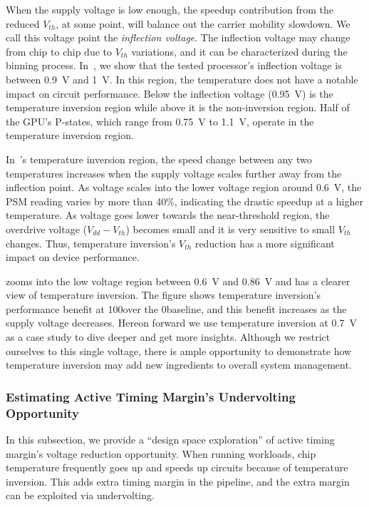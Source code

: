 When the supply voltage is low enough, the speedup contribution from the reduced $V_{th}$, at some point, will balance out the carrier mobility slowdown. We call this voltage point the {\it inflection voltage}. The inflection voltage may change from chip to chip due to $V_{th}$ variations, and it can be characterized during the binning process. In~, we show that the tested processor's inflection voltage is between 0.9~V and 1~V. In this region, the temperature does not have a notable impact on circuit performance. Below the inflection voltage (0.95~V) is the temperature inversion region while above it is the non-inversion region. Half of the GPU's P-states, which range from 0.75~V to 1.1~V, operate in the temperature inversion region.

In~'s temperature inversion region, the speed change between any two temperatures increases when the supply voltage scales further away from the inflection point. As voltage scales into the lower voltage region around 0.6~V, the PSM reading varies by more than 40\%, indicating the drastic speedup at a higher temperature. As voltage goes lower towards the near-threshold region, the overdrive voltage ($V_{dd}-V_{th}$) becomes small and it is very sensitive to small $V_{th}$ changes. Thus, temperature inversion's $V_{th}$ reduction has a more significant impact on device performance.

 zooms into the low voltage region between 0.6~V and 0.86~V and has a clearer view of temperature inversion. The figure shows temperature inversion's performance benefit at 100\C over the 0\C baseline, and this benefit increases as the supply voltage decreases. Hereon forward we use temperature inversion at 0.7~V as a case study to dive deeper and get more insights. Although we restrict ourselves to this single voltage, there is ample opportunity to demonstrate how temperature inversion may add new ingredients to overall system management.

\subsubsection{Estimating Active Timing Margin's Undervolting Opportunity}
\label{sec:temperature:characterize:extrapolate}

In this subsection, we provide a ``design space exploration'' of active timing margin's voltage reduction opportunity. When running workloads, chip temperature frequently goes up and speeds up circuits because of temperature inversion. This adds extra timing margin in the pipeline, and the extra margin can be exploited via undervolting. 

